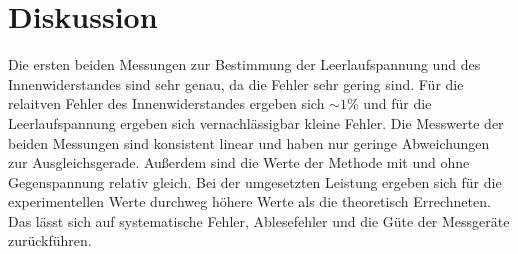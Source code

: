 \newpage
\section{Diskussion}
Die ersten beiden Messungen zur Bestimmung der Leerlaufspannung und des Innenwiderstandes sind sehr genau, da die Fehler sehr gering sind.
Für die relaitven Fehler des Innenwiderstandes ergeben sich $\sim 1\%$ und für die Leerlaufspannung ergeben sich vernachlässigbar kleine Fehler.
Die Messwerte der beiden Messungen sind konsistent linear und haben nur geringe Abweichungen zur Ausgleichsgerade.
Außerdem sind die Werte der Methode mit und ohne Gegenspannung relativ gleich.
Bei der umgesetzten Leistung ergeben sich für die experimentellen Werte durchweg höhere Werte als die theoretisch Errechneten.
Das lässt sich auf systematische Fehler, Ablesefehler und die Güte der Messgeräte zurückführen.
